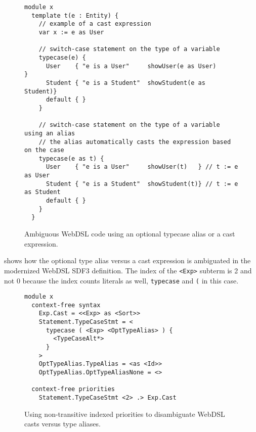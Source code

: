       \begin{figure}
        \begin{verbatim}
module x
  template t(e : Entity) {
    // example of a cast expression
    var x := e as User

    // switch-case statement on the type of a variable
    typecase(e) {
      User    { "e is a User"     showUser(e as User)      }
      Student { "e is a Student"  showStudent(e as Student)}
      default { }
    }

    // switch-case statement on the type of a variable using an alias
    // the alias automatically casts the expression based on the case
    typecase(e as t) {
      User    { "e is a User"     showUser(t)   } // t := e as User
      Student { "e is a Student"  showStudent(t)} // t := e as Student
      default { }
    }
  }
        \end{verbatim}
        \caption{\label{fig:sdf3-webdsl-typecase}Ambiguous WebDSL code using an optional typecase alias or a cast expression.}
      \end{figure}

       shows how the optional type alias versus a cast expression is ambiguated in the modernized WebDSL SDF3 definition. The index of the \texttt{<Exp>} subterm is 2 and not 0 because the index counts literals as well, \texttt{typecase} and \texttt{(} in this case.

      \begin{figure}
        \begin{verbatim}
module x
  context-free syntax
    Exp.Cast = <<Exp> as <Sort>>
    Statement.TypeCaseStmt = <
      typecase ( <Exp> <OptTypeAlias> ) {
        <TypeCaseAlt*>
      }
    >
    OptTypeAlias.TypeAlias = <as <Id>>
    OptTypeAlias.OptTypeAliasNone = <>

  context-free priorities
    Statement.TypeCaseStmt <2> .> Exp.Cast
        \end{verbatim}
        \caption{\label{fig:sdf3-typecase-disambiguation}Using non-transitive indexed priorities to disambiguate WebDSL casts versus type aliases.}
      \end{figure}
